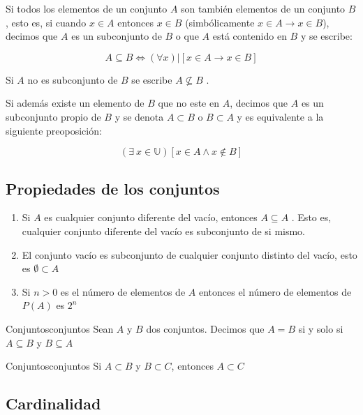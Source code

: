 Si todos los elementos de un conjunto $A$ son también elementos de un conjunto
$B$, esto es, si cuando $x \in A$ entonces $x \in B$ (simbólicamente $x \in A
\rightarrow x \in B$), decimos que $A$ es un subconjunto de $B$ o que $A$ está
contenido en $B$ y se escribe:

\begin{equation}
    A \subseteq B \iff (\forall x)|[x \in A \rightarrow x \in B]
\end{equation}

Si $A$ no es subconjunto de $B$ se escribe $A \not \subseteq B$ .

Si además existe un elemento de $B$ que no este en $A$, decimos que $A$ es un
subconjunto propio de $B$ y se denota $A \subset B$ o $B \subset A$ y es
equivalente a la siguiente preoposición:

\begin{equation}
    (\exists \ x \in \mathbb U)[x \in A \land x \not\in B]
\end{equation}

\subsection{Propiedades de los conjuntos}

\begin{enumerate}
    \item Si $A$ es cualquier conjunto diferente del vacío, entonces $A \subseteq A$ .
    Esto es, cualquier conjunto diferente del vacío es subconjunto de si mismo.

    \item El conjunto vacío es subconjunto de cualquier conjunto distinto del vacío,
    esto es $\emptyset \subset A$

    \item Si $n>0$ es el número de elementos de $A$ entonces el número de elementos
de $P(A)$ es $2^n$
\end{enumerate}

\begin{theorem}{Conjuntos}{conjuntos}
Sean $A$ y $B$ dos conjuntos. Decimos que $A=B$ si y solo si $A \subseteq B$ y
$B \subseteq A$
\end{theorem}

\begin{theorem}{Conjuntos}{conjuntos}
    Si $ A \subset B $ y $ B \subset C $, entonces $ A \subset C $
\end{theorem}

\subsection{Cardinalidad}

